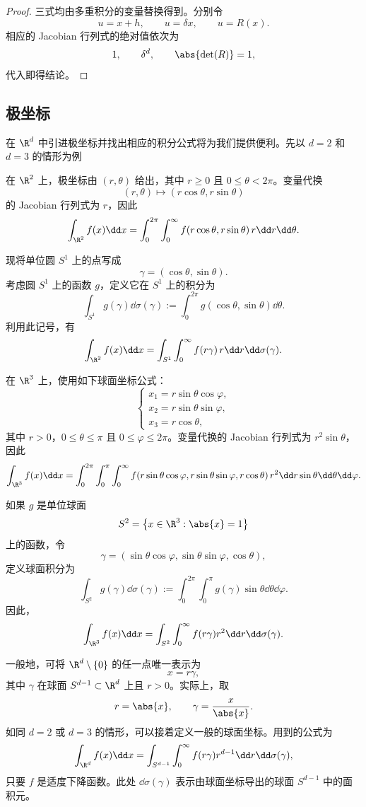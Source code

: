 \begin{proof}
	三式均由多重积分的变量替换得到。分别令
	\[
	u=x+h,\qquad u=\delta x,\qquad u=R(x).
	\]
	相应的 Jacobian 行列式的绝对值依次为
	\[
	1,\qquad \delta^d,\qquad \abs{\det(R)}=1,
	\]
	代入即得结论。
\end{proof}

\subsection*{极坐标}

在 $\R^d$ 中引进极坐标并找出相应的积分公式将为我们提供便利。先以 $d=2$ 和 $d=3$ 的情形为例

\begin{example}
	在 $\R^2$ 上，极坐标由 $(r,\theta)$ 给出，其中 $r\geq0$ 且 $0\leq\theta<2\pi$。变量代换
	\[
	(r,\theta)\longmapsto(r\cos\theta,r\sin\theta)
	\]
	的 Jacobian 行列式为 $r$，因此
	\[
	\int_{\R^2}f(x)\dd x
	=\int_0^{2\pi}\int_0^\infty
	f(r\cos\theta,r\sin\theta)\,r\dd r\dd\theta.
	\]
\end{example}

现将单位圆 $S^1$ 上的点写成
\[
\gamma=(\cos\theta,\sin\theta).
\]
考虑圆 $S^1$ 上的函数 $g$，定义它在 $S^1$ 上的积分为
\[
\int_{S^1}g(\gamma)\dd\sigma(\gamma)
:=\int_0^{2\pi}g(\cos\theta,\sin\theta)\dd\theta.
\]
利用此记号，有
\[
\int_{\R^2}f(x)\dd x
=\int_{S^1}\int_0^\infty f(r\gamma)\,r\dd r\dd\sigma(\gamma).
\]

\begin{example}
	在 $\R^3$ 上，使用如下球面坐标公式：
	\[
	\begin{cases}
		x_1=r\sin\theta\cos\varphi,\\
		x_2=r\sin\theta\sin\varphi,\\
		x_3=r\cos\theta,
	\end{cases}
	\]
	其中 $r>0$，$0\leq\theta\leq\pi$ 且 $0\leq\varphi\leq2\pi$。变量代换的 Jacobian 行列式为
	$r^2\sin\theta$，因此
	\[
	\int_{\R^3}f(x)\dd x
	=\int_0^{2\pi}\int_0^\pi\int_0^\infty
	f(r\sin\theta\cos\varphi,
	  r\sin\theta\sin\varphi,
	  r\cos\theta)
	\,r^2\dd r\sin\theta\dd\theta\dd\varphi.
	\]
\end{example}

如果 $g$ 是单位球面
\[
S^2=\left\{x\in\R^3:\abs{x}=1\right\}
\]
上的函数，令
\[
\gamma=(\sin\theta\cos\varphi,
        \sin\theta\sin\varphi,
        \cos\theta),
\]
定义球面积分为
\[
\int_{S^2}g(\gamma)\dd\sigma(\gamma)
:=\int_0^{2\pi}\int_0^\pi
g(\gamma)\sin\theta\dd\theta\dd\varphi.
\]
因此，
\[
\int_{\R^3}f(x)\dd x
=\int_{S^2}\int_0^\infty
f(r\gamma)r^2\dd r\dd\sigma(\gamma).
\]

一般地，可将 $\R^d\setminus\{0\}$ 的任一点唯一表示为
\[
x=r\gamma,
\]
其中 $\gamma$ 在球面 $S^{d-1}\subset\R^d$ 上且 $r>0$。实际上，取
\[
r=\abs{x},\qquad \gamma=\frac{x}{\abs{x}}.
\]
如同 $d=2$ 或 $d=3$ 的情形，可以接着定义一般的球面坐标。用到的公式为
\[
\int_{\R^d}f(x)\dd x
=\int_{S^{d-1}}\int_0^\infty
f(r\gamma)r^{d-1}\dd r\dd\sigma(\gamma),
\]
只要 $f$ 是适度下降函数。此处 $\dd\sigma(\gamma)$ 表示由球面坐标导出的球面 $S^{d-1}$ 中的面积元。

